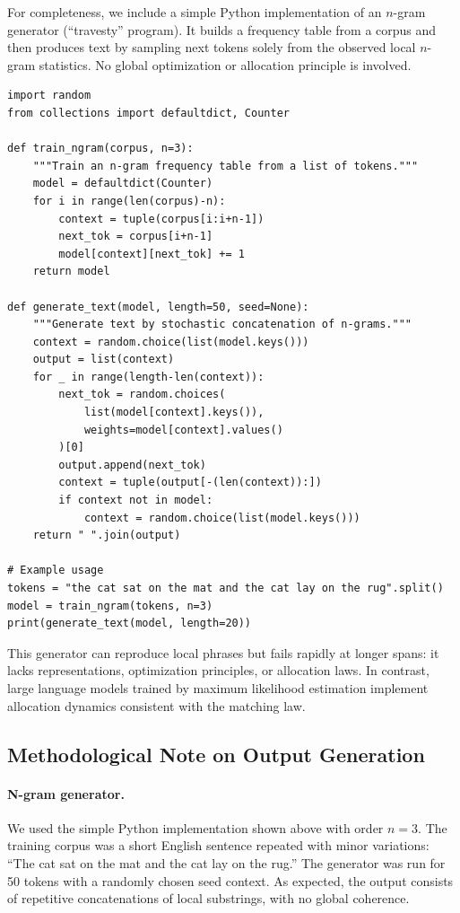 \documentclass[11pt]{article}
\begin{document}
For completeness, we include a simple Python implementation of an $n$-gram
generator (``travesty'' program). It builds a frequency table from a corpus and
then produces text by sampling next tokens solely from the observed local
$n$-gram statistics. No global optimization or allocation principle is
involved.

\begin{verbatim}
import random
from collections import defaultdict, Counter

def train_ngram(corpus, n=3):
    """Train an n-gram frequency table from a list of tokens."""
    model = defaultdict(Counter)
    for i in range(len(corpus)-n):
        context = tuple(corpus[i:i+n-1])
        next_tok = corpus[i+n-1]
        model[context][next_tok] += 1
    return model

def generate_text(model, length=50, seed=None):
    """Generate text by stochastic concatenation of n-grams."""
    context = random.choice(list(model.keys()))
    output = list(context)
    for _ in range(length-len(context)):
        next_tok = random.choices(
            list(model[context].keys()),
            weights=model[context].values()
        )[0]
        output.append(next_tok)
        context = tuple(output[-(len(context)):])
        if context not in model:
            context = random.choice(list(model.keys()))
    return " ".join(output)

# Example usage
tokens = "the cat sat on the mat and the cat lay on the rug".split()
model = train_ngram(tokens, n=3)
print(generate_text(model, length=20))
\end{verbatim}

This generator can reproduce local phrases but fails rapidly at longer spans:
it lacks representations, optimization principles, or allocation laws. In
contrast, large language models trained by maximum likelihood estimation
implement allocation dynamics consistent with the matching law.


\subsection*{Methodological Note on Output Generation}

\paragraph{N-gram generator.}
We used the simple Python implementation shown above with order $n{=}3$. The
training corpus was a short English sentence repeated with minor variations:
``The cat sat on the mat and the cat lay on the rug.'' The generator was run for
50 tokens with a randomly chosen seed context. As expected, the output consists
of repetitive concatenations of local substrings, with no global coherence.
\end{document}
